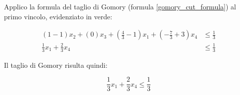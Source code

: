 \documentclass[\main/main.tex]{subfiles}
\begin{document}
Applico la formula del taglio di Gomory (formula \ref{gomory_cut_formula}) al primo vincolo, evidenziato in verde:

\begin{align*}
  (1-1)x_2 + (0)x_3 + (\frac{4}{3}-1)x_1 + (-\frac{7}{3} + 3)x_4 & \leq \frac{1}{3} \\
  \frac{1}{3}x_1 + \frac{2}{3}x_4                                & \leq \frac{1}{3}
\end{align*}

Il taglio di Gomory risulta quindi:

\[
  \frac{1}{3}x_1 + \frac{2}{3}x_4 \leq \frac{1}{3}
\]
\end{document}
